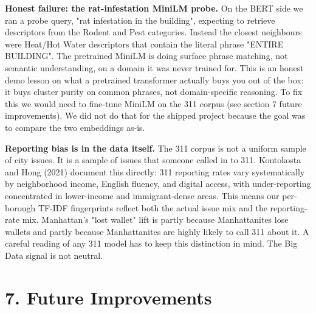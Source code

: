 \documentclass[11pt,letterpaper]{article}
\begin{document}
\textbf{Honest failure: the rat-infestation MiniLM probe.} On the BERT side we ran a probe query, "rat infestation in the building", expecting to retrieve descriptors from the Rodent and Pest categories. Instead the closest neighbours were Heat/Hot Water descriptors that contain the literal phrase "ENTIRE BUILDING". The pretrained MiniLM is doing surface phrase matching, not semantic understanding, on a domain it was never trained for. This is an honest demo lesson on what a pretrained transformer actually buys you out of the box: it buys cluster purity on common phrases, not domain-specific reasoning. To fix this we would need to fine-tune MiniLM on the 311 corpus (see section 7 future improvements). We did not do that for the shipped project because the goal was to compare the two embeddings as-is.

\textbf{Reporting bias is in the data itself.} The 311 corpus is not a uniform sample of city issues. It is a sample of issues that someone called in to 311. Kontokosta and Hong (2021) document this directly: 311 reporting rates vary systematically by neighborhood income, English fluency, and digital access, with under-reporting concentrated in lower-income and immigrant-dense areas. This means our per-borough TF-IDF fingerprints reflect both the actual issue mix and the reporting-rate mix. Manhattan's "lost wallet" lift is partly because Manhattanites lose wallets and partly because Manhattanites are highly likely to call 311 about it. A careful reading of any 311 model has to keep this distinction in mind. The Big Data signal is not neutral.

\newpage
\section{7. Future Improvements}
\end{document}
